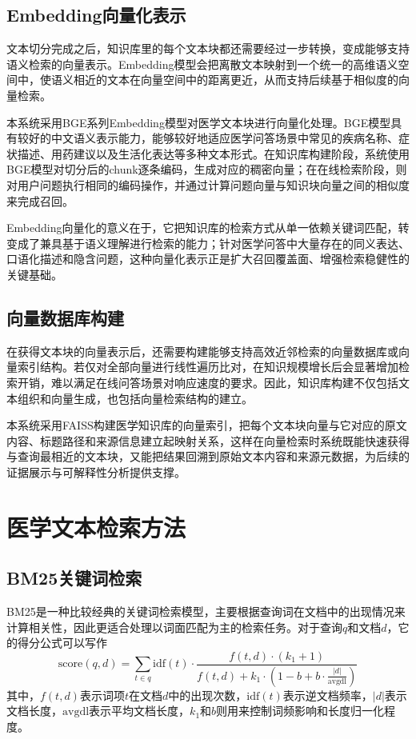 \subsection{Embedding向量化表示}

文本切分完成之后，知识库里的每个文本块都还需要经过一步转换，变成能够支持语义检索的向量表示。Embedding模型会把离散文本映射到一个统一的高维语义空间中，使语义相近的文本在向量空间中的距离更近，从而支持后续基于相似度的向量检索。

本系统采用BGE系列Embedding模型对医学文本块进行向量化处理。BGE模型具有较好的中文语义表示能力，能够较好地适应医学问答场景中常见的疾病名称、症状描述、用药建议以及生活化表达等多种文本形式。在知识库构建阶段，系统使用BGE模型对切分后的chunk逐条编码，生成对应的稠密向量；在在线检索阶段，则对用户问题执行相同的编码操作，并通过计算问题向量与知识块向量之间的相似度来完成召回。

Embedding向量化的意义在于，它把知识库的检索方式从单一依赖关键词匹配，转变成了兼具基于语义理解进行检索的能力；针对医学问答中大量存在的同义表达、口语化描述和隐含问题，这种向量化表示正是扩大召回覆盖面、增强检索稳健性的关键基础。

\subsection{向量数据库构建}

在获得文本块的向量表示后，还需要构建能够支持高效近邻检索的向量数据库或向量索引结构。若仅对全部向量进行线性遍历比对，在知识规模增长后会显著增加检索开销，难以满足在线问答场景对响应速度的要求。因此，知识库构建不仅包括文本组织和向量生成，也包括向量检索结构的建立。

本系统采用FAISS构建医学知识库的向量索引，把每个文本块向量与它对应的原文内容、标题路径和来源信息建立起映射关系，这样在向量检索时系统既能快速获得与查询最相近的文本块，又能把结果回溯到原始文本内容和来源元数据，为后续的证据展示与可解释性分析提供支撑。

\section{医学文本检索方法}

\subsection{BM25关键词检索}

BM25是一种比较经典的关键词检索模型，主要根据查询词在文档中的出现情况来计算相关性，因此更适合处理以词面匹配为主的检索任务。对于查询$q$和文档$d$，它的得分公式可以写作
\begin{equation}
\mathrm{score}(q,d)=\sum_{t\in q}\mathrm{idf}(t)\cdot
\frac{f(t,d)\cdot(k_1+1)}{f(t,d)+k_1\cdot(1-b+b\cdot\frac{|d|}{\mathrm{avgdl}})}
\end{equation}
其中，$f(t,d)$表示词项$t$在文档$d$中的出现次数，$\mathrm{idf}(t)$表示逆文档频率，$|d|$表示文档长度，$\mathrm{avgdl}$表示平均文档长度，$k_1$和$b$则用来控制词频影响和长度归一化程度。


